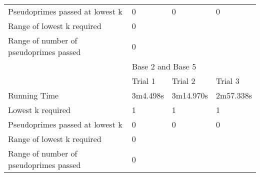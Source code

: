 \documentclass{article}
\begin{document}
\begin{appendices}
\begin{table}[h]
\begin{tabular}{@{}llll@{}}
Pseudoprimes passed at lowest k        & 0           & 0          & 0          \\\cmidrule(lr){2-4}
Range of lowest k required             & \multicolumn{3}{l}{0}                 \\
Range of number of pseudoprimes passed & \multicolumn{3}{l}{0}                 \\\midrule
                                       & \multicolumn{3}{l}{Base 2 and Base 5} \\\midrule
                                       & Trial 1     & Trial 2    & Trial 3    \\
Running Time                           & 3m4.498s    & 3m14.970s  & 2m57.338s  \\
Lowest k required                      & 1           & 1          & 1          \\
Pseudoprimes passed at lowest k        & 0           & 0          & 0          \\\cmidrule(lr){2-4}
Range of lowest k required             & \multicolumn{3}{l}{0}                 \\
Range of number of pseudoprimes passed & \multicolumn{3}{l}{0}                 \\ \bottomrule
\end{tabular}
\end{table}
\FloatBarrier


\end{appendices}
\end{document}
